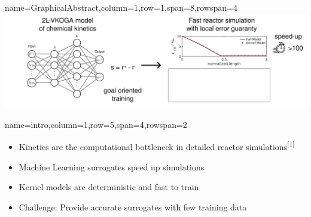 \documentclass[
	accentcolor=3c,
	boxstyle=colored, %
	colorback=false,
	title=small
	]{tudasciposter}
\begin{document}
\begin{tcbposter}[
	poster={
		columns=8,
		rows=12,
		spacing=1cm,
	},]

\begin{posterboxenv}{name=GraphicalAbstract,column=1,row=1,span=8,rowspan=4}
	\centering
	\includegraphics[width=\textwidth]{abb/GA_draft}
\end{posterboxenv}

\begin{posterboxenv}[title=1. Introduction]{name=intro,column=1,row=5,span=4,rowspan=2}
	\begin{itemize}
		\item Kinetics are the computational bottleneck in detailed reactor simulations\textsuperscript{[1]}
		\item Machine Learning surrogates speed up simulations
		\item Kernel models are deterministic and fast to train 
		\item Challenge: Provide accurate surrogates with few training data
	\end{itemize}
\end{posterboxenv}


\end{tcbposter}
\end{document}
